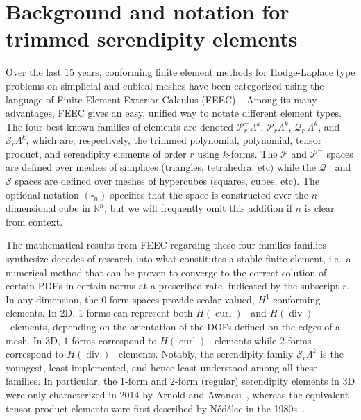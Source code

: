 \documentclass[format=acmsmall,screen,timestamp=false,a4paper]{acmart}
\DeclareMathOperator{\Div}{div}
\DeclareMathOperator{\curl}{curl}
\newcommand{\R}{\mathbb{R}}
\newcommand{\calP}{\mathcal{P}}
\newcommand{\calQ}{\mathcal{Q}}
\newcommand{\calS}{\mathcal{S}}
\newcommand{\hcurl}{\ensuremath{{H}(\curl ) } }
\newcommand{\hdiv}{\ensuremath{{H}(\Div ) } }
\begin{document}
  
  
\section{Background and notation for trimmed serendipity elements}
   
    Over the last 15 years, conforming finite element methods for Hodge-Laplace type problems on simplicial and cubical meshes have been categorized using the language of Finite Element Exterior Calculus (FEEC)~\cite{AFW2006,AFW2010,ABB2012}.  Among its many advantages, FEEC gives an easy, unified way to notate different element types.  The four best known families of elements are denoted $\calP^-_r \Lambda^k$, $\calP_r \Lambda^k$, $\calQ^-_r \Lambda^k$, and $\calS_r \Lambda^k$, which are, respectively, the trimmed polynomial, polynomial, tensor product, and serendipity elements of order $r$ using $k$-forms.  The $\calP$ and $\calP^-$ spaces are defined over meshes of simplices (triangles, tetrahedra, etc) while the $\calQ^-$ and $\calS$ spaces are defined over meshes of hypercubes (squares, cubes, etc). The optional notation $(\square_n)$ specifies that the space is constructed over the $n$-dimensional cube in $\R^n$, but we will frequently omit this addition if $n$ is clear from context.
    
    The mathematical results from FEEC regarding these four families families synthesize decades of research into what constitutes a stable finite element, i.e.\ a numerical method that can be proven to converge to the correct solution of certain PDEs in certain norms at a prescribed rate, indicated by the subscript $r$.  In any dimension, the $0$-form spaces provide scalar-valued, $H^1$-conforming elements.  In 2D, $1$-forms can represent both \hcurl~and \hdiv~elements, depending on the orientation of the DOFs defined on the edges of a mesh.  In 3D, $1$-forms correspond to \hcurl~elements while $2$-forms correspond to \hdiv~elements.  Notably, the serendipity family $\calS_r\Lambda^k$ is the youngest, least implemented, and hence least understood among all these families.  In particular, the 1-form and 2-form (regular) serendipity elements in 3D were only characterized in 2014 by Arnold and Awanou~\cite{arnold2014finite}, whereas the equivalent tensor product elements were first described by N\'ed\'elec in the 1980s~\cite{N1980,N1986}.
 
\end{document}
